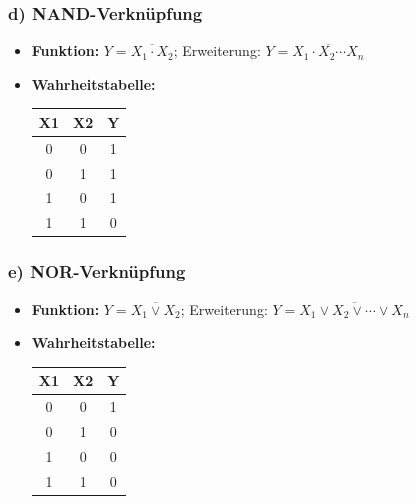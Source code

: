 \documentclass[11pt,a4paper]{article}
\begin{document}
\subsubsection{d) NAND-Verknüpfung}
\begin{itemize}
    \item \textbf{Funktion:} $Y = \overline{X_1 \cdot X_2}$; Erweiterung: $Y = \overline{X_1 \cdot X_2 \cdots X_n}$
    \item \textbf{Wahrheitstabelle:}
    \begin{center}
    \begin{tabular}{ccc}
        \toprule
        X1 & X2 & Y \\ \midrule
        0 & 0 & 1 \\
        0 & 1 & 1 \\
        1 & 0 & 1 \\
        1 & 1 & 0 \\ \bottomrule
    \end{tabular}
    \end{center}
\end{itemize}

\subsubsection{e) NOR-Verknüpfung}
\begin{itemize}
    \item \textbf{Funktion:} $Y = \overline{X_1 \vee X_2}$; Erweiterung: $Y = \overline{X_1 \vee X_2 \vee \cdots \vee X_n}$
    \item \textbf{Wahrheitstabelle:}
    \begin{center}
    \begin{tabular}{ccc}
        \toprule
        X1 & X2 & Y \\ \midrule
        0 & 0 & 1 \\
        0 & 1 & 0 \\
        1 & 0 & 0 \\
        1 & 1 & 0 \\ \bottomrule
    \end{tabular}
    \end{center}
\end{itemize}
\end{document}
